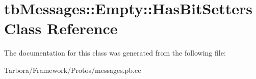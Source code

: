 \hypertarget{classtbMessages_1_1Empty_1_1HasBitSetters}{}\section{tb\+Messages\+:\+:Empty\+:\+:Has\+Bit\+Setters Class Reference}
\label{classtbMessages_1_1Empty_1_1HasBitSetters}


The documentation for this class was generated from the following file\+:\begin{DoxyCompactItemize}
\item 
Tarbora/\+Framework/\+Protos/messages.\+pb.\+cc\end{DoxyCompactItemize}
